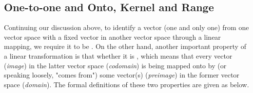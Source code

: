 \subsection{One-to-one and Onto, Kernel and Range}

Continuing our discussion above, to identify a vector (one and only one) from one vector space with a fixed vector in another vector space through a linear mapping, we require it to be . On the other hand, another important property of a linear transformation is that whether it is , which means that every vector (\textit{image}) in the latter vector space (\textit{codomain}) is being mapped onto by (or speaking loosely, "comes from") some vector(s) (\textit{preimage}) in the former vector space (\textit{domain}). The formal definitions of these two properties are given as below.

